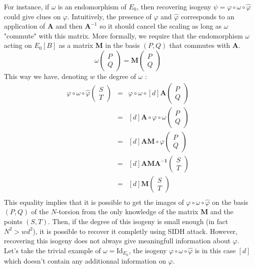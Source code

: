 \documentclass[12pt,a4paper]{article}
\begin{document}
		For instance, if $\omega$ is an endomorphism of $E_0$,
		then recovering isogeny $\psi = \varphi \circ \omega \circ \widehat\varphi$
		could give clues on $\varphi$. Intuitively, the presence of $\varphi$ and
		$\widehat\varphi$ corresponds to an application of $\mathbf A$ and then $\mathbf A^{-1}$
		so it should cancel the scaling as long as $\omega$ "commute" with this matrix.
		More formally, we require that the endomorphism $\omega$ acting on $E_0[B]$ as a matrix
		$\mathbf M$ in the basis $(P,Q)$ that commutes with $\mathbf A$.
		\[
			\omega \begin{pmatrix} P \\ Q\end{pmatrix} = \mathbf M \begin{pmatrix} P \\ Q \end{pmatrix}
		\] 
		This way we have, denoting $w$ the degree of $\omega$ :
		\begin{eqnarray*}
			\varphi\circ\omega\circ\widehat\varphi \begin{pmatrix} S \\ T \end{pmatrix}
		&=& \varphi\circ\omega\circ [d]  \mathbf A \begin{pmatrix} P \\ Q \end{pmatrix} \\
		&=& [d]\mathbf A \circ \varphi\circ\omega \begin{pmatrix} P \\ Q \end{pmatrix} \\
		&=& [d]\mathbf{AM} \circ \varphi \begin{pmatrix} P \\ Q \end{pmatrix} \\
		&=& [d]\mathbf{AMA^{-1}}  \begin{pmatrix} S \\ T \end{pmatrix} \\
		&=& [d]\mathbf{M}  \begin{pmatrix} S \\ T \end{pmatrix} \\
		\end{eqnarray*}
		This equality implies that it is possible to get the images of $\varphi\circ\omega
		\circ\widehat\varphi$ on the basis $(P,Q)$ of the $N$-torsion from the only knowledge
		of the matrix $\mathbf M$ and the points $(S,T)$. Then, if the degree of this isogeny
		is small enough (in fact $N^2>wd^2$), it is possible to recover it completly using SIDH attack. 
		However, recovering this isogeny
		does not always give meaningfull information about $\varphi$. Let's take the trivial
		example of $\omega=\mathrm{Id}_{E_0}$, the isogeny $\varphi\circ\omega\circ\widehat\varphi$
		is in this case $[d]$ which doesn't contain any additionnal information on $\varphi$.
\end{document}
